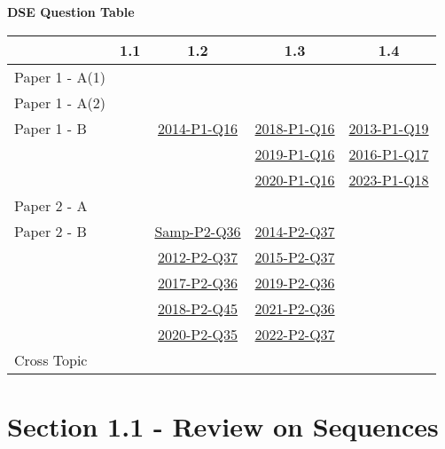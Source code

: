 \documentclass[12pt, a4paper]{article}
\begin{document}
\begin{absolutelynopagebreak}
\begin{center}
\textbf{DSE Question Table}
\end{center}
\begin{center}
\begin{tabular}{|l|c|c|c|c|}
\hline
        & 1.1 & 1.2 & 1.3 & 1.4 \\\hline
\hline
Paper 1 - A(1)&  &  &  &  \\
\hline
Paper 1 - A(2)&  &  &  &  \\
\hline
Paper 1 - B&  & \hyperref[DSE2014-CoreP1-Q16]{2014-P1-Q16} & \hyperref[DSE2018-CoreP1-Q16]{2018-P1-Q16} & \hyperref[DSE2013-CoreP1-Q19]{2013-P1-Q19} \\
&  &  & \hyperref[DSE2019-CoreP1-Q16]{2019-P1-Q16} & \hyperref[DSE2016-CoreP1-Q17]{2016-P1-Q17} \\
&  &  & \hyperref[DSE2020-CoreP1-Q16]{2020-P1-Q16} & \hyperref[DSE2023-CoreP1-Q18]{2023-P1-Q18} \\
\hline
\hline
Paper 2 - A&  &  &  &  \\
\hline
Paper 2 - B&  & \hyperref[DSE2012S-CoreP2-Q36]{Samp-P2-Q36} & \hyperref[DSE2014-CoreP2-Q37]{2014-P2-Q37} &  \\
&  & \hyperref[DSE2012-CoreP2-Q37]{2012-P2-Q37} & \hyperref[DSE2015-CoreP2-Q37]{2015-P2-Q37} &  \\
&  & \hyperref[DSE2017-CoreP2-Q36]{2017-P2-Q36} & \hyperref[DSE2019-CoreP2-Q36]{2019-P2-Q36} &  \\
&  & \hyperref[DSE2018-CoreP2-Q45]{2018-P2-Q45} & \hyperref[DSE2021-CoreP2-Q36]{2021-P2-Q36} &  \\
&  & \hyperref[DSE2020-CoreP2-Q35]{2020-P2-Q35} & \hyperref[DSE2022-CoreP2-Q37]{2022-P2-Q37} &  \\
\hline
\hline
Cross Topic&  &  &  &  \\
\hline
\end{tabular}
\end{center}
\end{absolutelynopagebreak}




\section*{Section 1.1 - Review on Sequences}\label{section:6-1-1}





\end{document}

